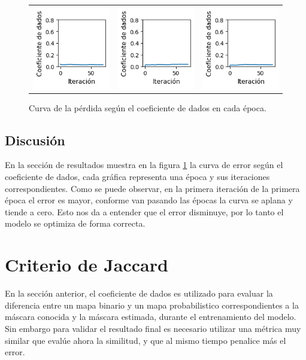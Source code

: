 \begin{figure}[ht]
\begin{tabular}{ccc}
        \includegraphics[width=4cm]{../Plots/dl_epoch_15.png} &
        \includegraphics[width=4cm]{../Plots/dl_epoch_16.png} &
        \includegraphics[width=4cm]{../Plots/dl_epoch_17.png} \\
    \end{tabular}        
    \caption{Curva de la pérdida según el coeficiente de dados en cada época.}
    \label{fig:dice_loss_epochs}
\end{figure}

\subsection{Discusión}
En la sección de resultados muestra en la figura \ref{fig:dice_loss_epochs} la curva de error según el coeficiente de dados, cada gráfica representa una época y sus iteraciones correspondientes. Como se puede observar, en la primera iteración de la primera época el error es mayor, conforme van pasando las épocas la curva se aplana y tiende a cero. Esto nos da a entender que el error disminuye, por lo tanto el modelo se optimiza de forma correcta. 

\clearpage

\section{Criterio de Jaccard}
En la sección anterior, el coeficiente de dados es utilizado para evaluar la diferencia entre un mapa binario y un mapa probabilistico correspondientes a la máscara conocida y la máscara estimada, durante el entrenamiento del modelo. Sin embargo para validar el resultado final es necesario utilizar una métrica muy similar que evalúe ahora la similitud, y que al mismo tiempo penalice más el error.

